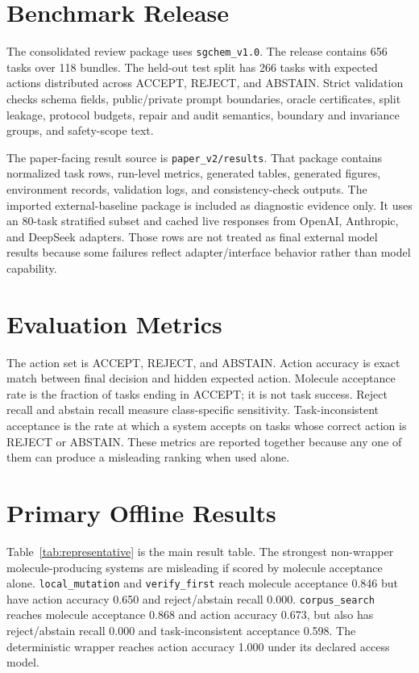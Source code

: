 \documentclass[11pt]{article}
\begin{document}
\section{Benchmark Release}

The consolidated review package uses \texttt{sgchem\_v1.0}. The release contains
656 tasks over 118 bundles. The held-out test split has 266 tasks with expected
actions distributed across ACCEPT, REJECT, and ABSTAIN. Strict validation checks
schema fields, public/private prompt boundaries, oracle certificates, split
leakage, protocol budgets, repair and audit semantics, boundary and invariance
groups, and safety-scope text.

The paper-facing result source is \texttt{paper\_v2/results}. That package
contains normalized task rows, run-level metrics, generated tables, generated
figures, environment records, validation logs, and consistency-check outputs.
The imported external-baseline package is included as diagnostic evidence only.
It uses an 80-task stratified subset and cached live responses from OpenAI,
Anthropic, and DeepSeek adapters. Those rows are not treated as final external
model results because some failures reflect adapter/interface behavior rather
than model capability.

\section{Evaluation Metrics}

The action set is ACCEPT, REJECT, and ABSTAIN. Action accuracy is exact match
between final decision and hidden expected action. Molecule acceptance rate is
the fraction of tasks ending in ACCEPT; it is not task success. Reject recall and
abstain recall measure class-specific sensitivity. Task-inconsistent acceptance
is the rate at which a system accepts on tasks whose correct action is REJECT or
ABSTAIN. These metrics are reported together because any one of them can produce
a misleading ranking when used alone.

\section{Primary Offline Results}

Table~\ref{tab:representative} is the main result table. The strongest
non-wrapper molecule-producing systems are misleading if scored by molecule
acceptance alone. \texttt{local\_mutation} and \texttt{verify\_first} reach
molecule acceptance 0.846 but have action accuracy 0.650 and reject/abstain
recall 0.000. \texttt{corpus\_search} reaches molecule acceptance 0.868 and
action accuracy 0.673, but also has reject/abstain recall 0.000 and
task-inconsistent acceptance 0.598. The deterministic wrapper reaches action
accuracy 1.000 under its declared access model.
\end{document}
